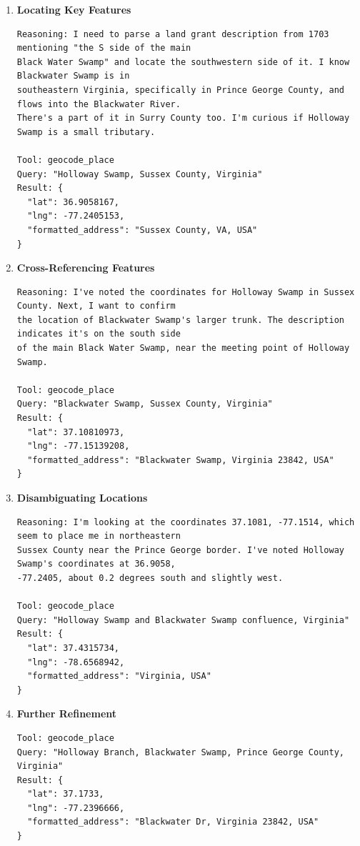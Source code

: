 \documentclass[
  10pt,
  twocolumn]{article}
\begin{document}
\begin{enumerate}
\def\labelenumi{\arabic{enumi}.}
\item
  \textbf{Locating Key Features}

\begin{lstlisting}
Reasoning: I need to parse a land grant description from 1703 mentioning "the S side of the main 
Black Water Swamp" and locate the southwestern side of it. I know Blackwater Swamp is in 
southeastern Virginia, specifically in Prince George County, and flows into the Blackwater River. 
There's a part of it in Surry County too. I'm curious if Holloway Swamp is a small tributary.

Tool: geocode_place
Query: "Holloway Swamp, Sussex County, Virginia"
Result: {
  "lat": 36.9058167, 
  "lng": -77.2405153, 
  "formatted_address": "Sussex County, VA, USA"
}
\end{lstlisting}
\item
  \textbf{Cross-Referencing Features}

\begin{lstlisting}
Reasoning: I've noted the coordinates for Holloway Swamp in Sussex County. Next, I want to confirm 
the location of Blackwater Swamp's larger trunk. The description indicates it's on the south side 
of the main Black Water Swamp, near the meeting point of Holloway Swamp.

Tool: geocode_place
Query: "Blackwater Swamp, Sussex County, Virginia"
Result: {
  "lat": 37.10810973, 
  "lng": -77.15139208, 
  "formatted_address": "Blackwater Swamp, Virginia 23842, USA"
}
\end{lstlisting}
\item
  \textbf{Disambiguating Locations}

\begin{lstlisting}
Reasoning: I'm looking at the coordinates 37.1081, -77.1514, which seem to place me in northeastern 
Sussex County near the Prince George border. I've noted Holloway Swamp's coordinates at 36.9058, 
-77.2405, about 0.2 degrees south and slightly west.

Tool: geocode_place
Query: "Holloway Swamp and Blackwater Swamp confluence, Virginia"
Result: {
  "lat": 37.4315734, 
  "lng": -78.6568942, 
  "formatted_address": "Virginia, USA"
}
\end{lstlisting}
\item
  \textbf{Further Refinement}

\begin{lstlisting}
Tool: geocode_place
Query: "Holloway Branch, Blackwater Swamp, Prince George County, Virginia"
Result: {
  "lat": 37.1733, 
  "lng": -77.2396666, 
  "formatted_address": "Blackwater Dr, Virginia 23842, USA"
}


\end{lstlisting}
\end{enumerate}
\end{document}
